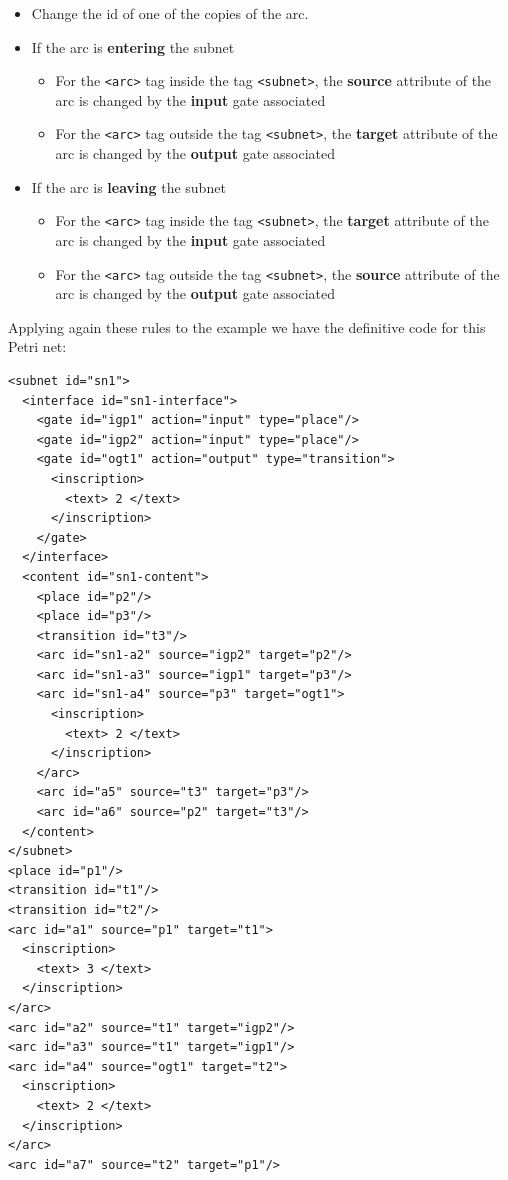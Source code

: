 \begin{itemize}
\item Change the id of one of the copies of the arc.
\item If the arc is \textbf{entering} the subnet
  \begin{itemize}
  \item For the \texttt{<arc>} tag inside the tag \texttt{<subnet>}, the \textbf{source} attribute of the arc is changed by the \textbf{input} gate associated
  \item For the \texttt{<arc>} tag outside the tag \texttt{<subnet>}, the \textbf{target} attribute of the arc is changed by the \textbf{output} gate associated
  \end{itemize}
\item If the arc is \textbf{leaving} the subnet
  \begin{itemize}
  \item For the \texttt{<arc>} tag inside the tag \texttt{<subnet>}, the \textbf{target} attribute of the arc is changed by the \textbf{input} gate associated
  \item For the \texttt{<arc>} tag outside the tag \texttt{<subnet>}, the \textbf{source} attribute of the arc is changed by the \textbf{output} gate associated
  \end{itemize}
\end{itemize}

Applying again these rules to the example we have the definitive code for this
Petri net:

\begin{lstlisting}[label=pmnl_final_representation,caption=Final PNML representation]
<subnet id="sn1">
  <interface id="sn1-interface">
    <gate id="igp1" action="input" type="place"/>
    <gate id="igp2" action="input" type="place"/>
    <gate id="ogt1" action="output" type="transition">
      <inscription>
        <text> 2 </text>
      </inscription>
    </gate>
  </interface>
  <content id="sn1-content">
    <place id="p2"/>
    <place id="p3"/>
    <transition id="t3"/>
    <arc id="sn1-a2" source="igp2" target="p2"/>
    <arc id="sn1-a3" source="igp1" target="p3"/>
    <arc id="sn1-a4" source="p3" target="ogt1">
      <inscription>
        <text> 2 </text>
      </inscription>
    </arc>
    <arc id="a5" source="t3" target="p3"/>
    <arc id="a6" source="p2" target="t3"/>
  </content>
</subnet>
<place id="p1"/>
<transition id="t1"/>
<transition id="t2"/>
<arc id="a1" source="p1" target="t1">
  <inscription>
    <text> 3 </text>
  </inscription>
</arc>
<arc id="a2" source="t1" target="igp2"/>
<arc id="a3" source="t1" target="igp1"/>
<arc id="a4" source="ogt1" target="t2">
  <inscription>
    <text> 2 </text>
  </inscription>
</arc>
<arc id="a7" source="t2" target="p1"/>
\end{lstlisting}

